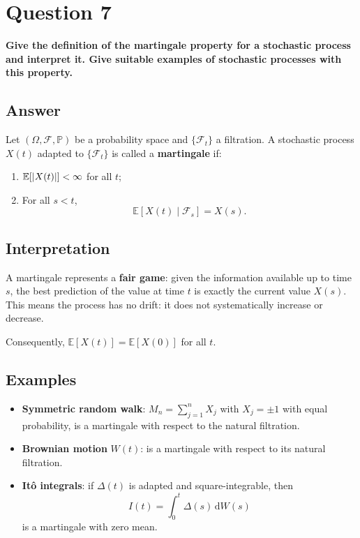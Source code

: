 \documentclass[12pt,a4paper]{book}
\theoremstyle{remark}
\newcommand{\PP}{\mathbb{P}}          %
\newcommand{\EE}{\mathbb{E}}          %
\newcommand{\F}{\mathcal{F}}          %
\newcommand{\Filtr}[1]{\{\mathcal{F}_{#1}\}} %
\DeclarePairedDelimiter{\abs}{\lvert}{\rvert}
\newcommand{\dd}{\mathrm{d}}
\begin{document}
\newpage
\section{Question 7}
\textbf{Give the definition of the martingale property for a stochastic process and interpret it. Give suitable examples of stochastic processes with this property.}

\subsection*{Answer}
Let $(\Omega, \F, \PP)$ be a probability space and $\Filtr{t}$ a filtration. A stochastic process $X(t)$ adapted to $\Filtr{t}$ is called a \textbf{martingale} if:

\begin{enumerate}[label=\roman*)]
    \item $\EE[\abs{X(t)}] < \infty$ for all $t$;
    \item For all $s < t$, 
    \[
        \EE[X(t) \mid \F_s] = X(s).
    \]
\end{enumerate}

\subsection*{Interpretation}
A martingale represents a \textbf{fair game}: given the information available up to time $s$, the best prediction of the value at time $t$ is exactly the current value $X(s)$. This means the process has no drift: it does not systematically increase or decrease.

Consequently, $\EE[X(t)] = \EE[X(0)]$ for all $t$.

\subsection*{Examples}
\begin{itemize}
    \item \textbf{Symmetric random walk}: $M_n = \sum_{j=1}^n X_j$ with $X_j = \pm 1$ with equal probability, is a martingale with respect to the natural filtration.
    \item \textbf{Brownian motion} $W(t)$: is a martingale with respect to its natural filtration.
    \item \textbf{It\^o integrals}: if $\Delta(t)$ is adapted and square-integrable, then 
    \[
    I(t) = \int_0^t \Delta(s)\,\dd W(s)
    \]
    is a martingale with zero mean.
\end{itemize}
\end{document}
